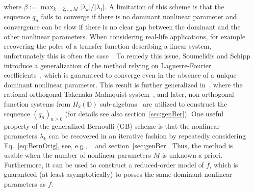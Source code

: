 \documentclass{arxiv}
\begin{document}
where $\beta := \max_{k=2,\ldots,M} |\lambda_k| / |\lambda_1|$. A limitation of this scheme is that the sequence $q_n$ fails to converge if there is no dominant nonlinear parameter and convergence can be slow if there is no clear gap between the dominant and the other nonlinear parameters. When considering real-life applications, for example recovering the poles of a transfer function describing a linear system, unfortunately this is often the case~\cite{szidar, vandenhof}. To remedy this issue, Soumelidis and Schipp introduce a generalization of the method relying on Laguerre-Fourier coefficients~\cite{SS1}, which is guaranteed to converge even in the absence of a unique dominant nonlinear parameter. This result is  further generalized in~\cite{siamdozsa}, where the rational orthogonal Takenaka-Malmquist system~\cite{takenakaorig, malmquistorig}, and later, non-orthogonal function systems from $H_2(\mathbb{D})$ sub-algebras~\cite{med24} are utilized to construct the sequence ${(q_n)}_{n \ge 0}$ (for details see also section~\ref{sec:genBer}). One useful property of the generalized Bernoulli (GB) scheme is that the nonlinear parameters $\lambda_k$ can be recovered in an iterative fashion by repeatedly considering Eq.~\eqref{eq:BernOrig}, see, e.g., ~\cite{SBS, SSSAB} and section~\ref{sec:genBer}. Thus, the method is usable when the number of nonlinear parameters $M$ is unknown a priori. Furthermore, it can be used to construct a reduced-order model of $f$, which is guaranteed (at least asymptotically) to posses the same dominant nonlinear parameters as $f$. 
\end{document}

